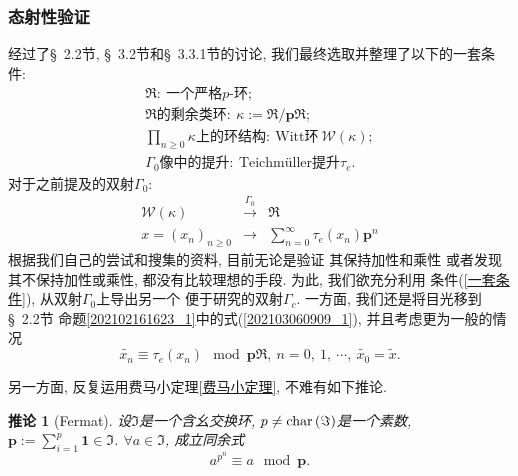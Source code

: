 \documentclass[UTF8, twoside]{ctexart}
\theoremstyle{nonumberplain}
\theoremstyle{nonumberplain}
\theoremstyle{plain}
\newtheorem{tuilun4}[dingyi4]{推论}
\begin{document}
	\subsubsection{态射性验证}
	经过了\S~2.2节, \S~3.2节和\S~3.3.1节的讨论, 我们最终选取并整理了以下的一套条件:
	\begin{equation} \label{一套条件}
		\begin{gathered}
			\Re:\ \text{一个严格}p\text{-环}; \\
			\Re\text{的剩余类环}:\ \kappa :=\Re /\bm{p}\Re ;
			\\
			\prod_{n\ge 0}^{{}}{\kappa }\text{上的环结构}
			:\ \text{Witt环}\ \mathcal{W}\left( \kappa  \right); \\
			\Gamma_0\text{像中的提升}:\ 
			\text{Teichmüller提升} {{\tau }_{e}}.
		\end{gathered}
	\end{equation}
	对于之前提及的双射$\Gamma_0:$
	\begin{equation} \label{环态射目标原式}
		\begin{matrix}
		\mathcal{W}\left( \kappa  \right) & 
		\xrightarrow{\Gamma_0} 
		& \Re   \\
		x={{\left( {{x}_{n}} \right)}_{n\ge 0}} & \to  & \sum\limits_{n=0}^{\infty }{{{\tau }_{e}}\left( {{x}_{n}} \right){\bm{p}^{n}}}
	\end{matrix}
	\end{equation}
	根据我们自己的尝试和搜集的资料, 目前无论是验证
	其保持加性和乘性
	或者发现其不保持加性或乘性, 都没有比较理想的手段.
	为此, 我们欲充分利用
	条件(\ref{一套条件}), 从双射$\Gamma_0$上导出另一个
	便于研究的双射$\Gamma_c$. 一方面, 我们还是将目光移到\S~2.2节
	命题\ref{202102161623_1}中的式(\ref{202103060909_1}), 并且考虑更为一般的情况
	\begin{equation} \label{202103061212_1}
		\widetilde{{{x}_{n}}}\equiv \tau_e \left( {{x}_{n}} \right)\ \bmod \bm{p}\Re ,
		\ n=0,\ 1,\ \cdots ,\ \widetilde{{{x}_{0}}}=\widetilde{x}.
	\end{equation}
	\vskip 0.5cm
	
	另一方面, 反复运用费马小定理\ref{费马小定理}, 不难有如下推论.
	\begin{tuilun4}[Fermat] \label{费马小定理推论}
		设$\Im $是一个含幺交换环, $p\ne \textup{char}\left( \Im  \right)$是一个素数, $\bm{p}:=\sum_{i=1}^{p}{\bm{1}\in \Im }$. $\forall a\in \Im $, 成立同余式
		\[
		{{a}^{p^n}}\equiv a\ \bmod \bm{p}.
		\]
	\end{tuilun4}
	\vskip 0.5cm
	
\end{document}
